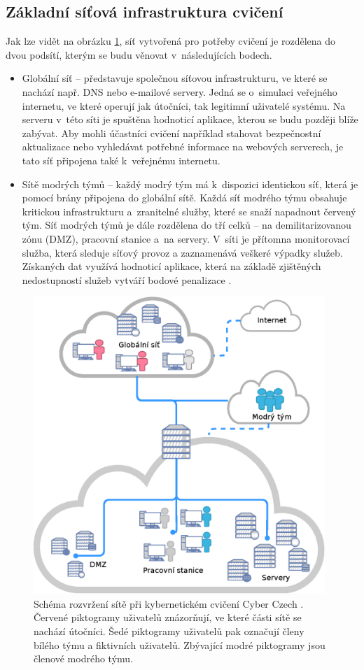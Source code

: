 \documentclass[
  digital,
  twoside,
  table, 
  nolof, 
  nolot
]{fithesis3}
\begin{document}
\subsection{Základní síťová infrastruktura cvičení}
Jak lze vidět na obrázku \ref{fig:kypoNetwork}, síť vytvořená pro potřeby cvičení je rozdělena do dvou podsítí, kterým se budu věnovat v~následujících bodech.

\begin{itemize}
    \item Globální síť -- představuje společnou síťovou infrastrukturu, ve které se nachází např. DNS nebo e-mailové servery. Jedná se o~simulaci veřejného internetu, ve které operují jak útočníci, tak legitimní uživatelé systému. Na serveru v~této síti je spuštěna hodnoticí aplikace, kterou se budu později blíže zabývat. Aby mohli účastníci cvičení například stahovat bezpečnostní aktualizace nebo vyhledávat potřebné informace na webových serverech, je tato síť připojena také k~veřejnému internetu.
    \item Sítě modrých týmů -- každý modrý tým má k~dispozici identickou síť, která je pomocí brány připojena do globální sítě. Každá síť modrého týmu obsahuje kritickou infrastrukturu a~zranitelné služby, které se snaží napadnout červený tým. Síť modrých týmů je dále rozdělena do tří celků -- na demilitarizovanou zónu (DMZ), pracovní stanice a~na servery. V~síti je přítomna monitorovací služba, která sleduje síťový provoz a zaznamenává veškeré výpadky služeb. Získaných dat využívá hodnoticí aplikace, která na základě zjištěných nedostupností služeb vytváří bodové penalizace \cite{1319597}.
\end{itemize}

\begin{figure}[ht]
    \centering
    \includegraphics[width=11cm]{images/kypo-network.eps}
    \caption{Schéma rozvržení sítě při kybernetickém cvičení Cyber Czech \cite{Vykopal2017LessonsRange}. Červené piktogramy uživatelů znázorňují, ve které části sítě se nachází útočníci. Šedé piktogramy uživatelů pak označují členy bílého týmu a fiktivních uživatelů. Zbývající modré piktogramy jsou členové modrého týmu.}
    \label{fig:kypoNetwork}
\end{figure}
\end{document}
